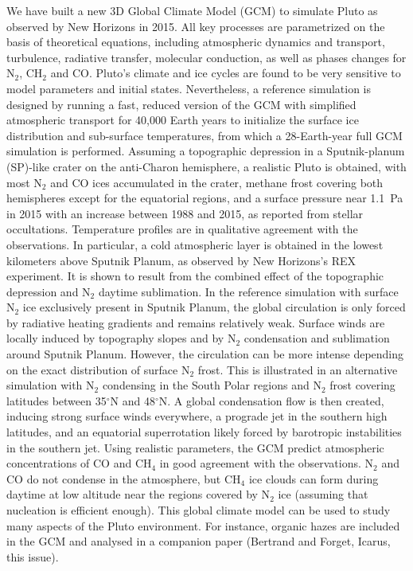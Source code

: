 We have built a new 3D Global Climate Model (GCM) to
simulate Pluto as observed by New Horizons in 2015.
All key processes are parametrized on the basis of theoretical
equations, including
atmospheric dynamics and transport,  turbulence,
radiative transfer, molecular conduction, 
as well as phases changes for N$_2$, CH$_2$ and CO. 
Pluto's climate and ice cycles are found to be very sensitive to model
parameters and initial states. Nevertheless, a reference simulation is designed by running a
fast, reduced version of the GCM with simplified atmospheric transport for 40,000 Earth years to
initialize the surface ice distribution and sub-surface temperatures, from which a
28-Earth-year full GCM simulation is performed. Assuming a topographic depression in a
Sputnik-planum (SP)-like crater on the anti-Charon hemisphere, a realistic Pluto is
obtained, with most N$_2$ and CO ices accumulated in the crater, methane frost
covering both hemispheres except for the equatorial regions, and a surface pressure near
1.1~Pa in 2015 with an increase between 1988 and 2015,  as reported 
from stellar occultations.
Temperature profiles are in qualitative agreement with the observations. In particular,
a cold atmospheric layer is obtained in the lowest kilometers above Sputnik Planum, as
observed by New Horizons's REX experiment. It is shown to result from the combined effect of the topographic
depression and  N$_2$ daytime sublimation. In the reference simulation with 
surface N$_2$ ice exclusively present in Sputnik Planum, the global circulation is only forced by
radiative heating gradients and remains relatively weak. Surface winds are locally 
induced by topography slopes and by N$_2$ condensation and sublimation around Sputnik
Planum.  However, the circulation can be more intense depending on the 
exact distribution of surface N$_2$ frost. This is illustrated in
an alternative simulation with N$_2$ condensing in the South Polar regions and N$_2$
frost covering latitudes between 35$^\circ$N and 48$^\circ$N. A global
condensation flow is then created, inducing strong surface winds everywhere, a prograde
jet in the southern high latitudes, 
and an equatorial superrotation likely forced by barotropic instabilities in
the southern jet. Using realistic parameters, the GCM predict atmospheric concentrations
of CO and CH$_4$ in good
agreement with the observations. N$_2$ and CO do not condense in the
atmosphere, but CH$_4$ ice clouds can form during daytime at low altitude near the regions
covered by N$_2$ ice (assuming that nucleation is efficient enough). 
This global climate model can
be used to study many aspects of the Pluto environment. For instance, organic hazes are
included in the GCM and analysed in a companion paper (Bertrand and Forget, Icarus, this issue).

